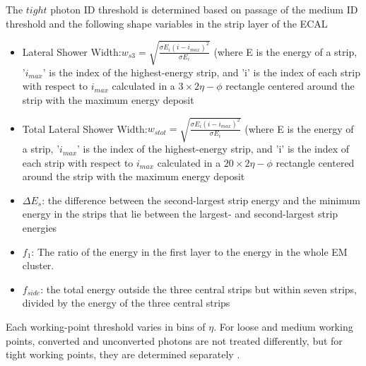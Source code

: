 The $tight$ photon ID threshold is determined based on passage of the medium ID threshold and the following shape variables in the strip layer of the ECAL
\begin{itemize}
  \item Lateral Shower Width:$w_{s3} = \sqrt{\frac{\sigma E_{i}(i-i_{max})^{2}}{\sigma E_{i}}}$ (where E is the energy of a strip, '$i_{max}$' is the index of the highest-energy strip, and 'i' is the index of each strip with respect to $i_{max}$ calculated in a $3 \times 2 \eta-\phi$  rectangle centered around the strip with the maximum energy deposit
  \item Total Lateral Shower Width:$w_{s tot} = \sqrt{\frac{\sigma E_{i}(i-i_{max})^{2}}{\sigma E_{i}}}$ (where E is the energy of a strip, '$i_{max}$' is the index of the highest-energy strip, and 'i' is the index of each strip with respect to $i_{max}$ calculated in a $20 \times 2 \eta-\phi$  rectangle centered around the strip with the maximum energy deposit
  \item $\Delta E_{s}$: the difference between the second-largest strip energy and the minimum energy in the strips that lie between the largest- and second-largest strip energies
  \item $f_{1}$: The ratio of the energy in the first layer to the energy in the whole EM cluster.
  \item $f_{side}$: the total energy outside the three central strips but within seven strips, divided by the energy of the three central strips 
\end{itemize}

Each working-point threshold varies in bins of $\eta$. For loose and medium working points, converted and unconverted photons are not treated differently, but for tight working points, they are determined separately \cite{gammaID}.

